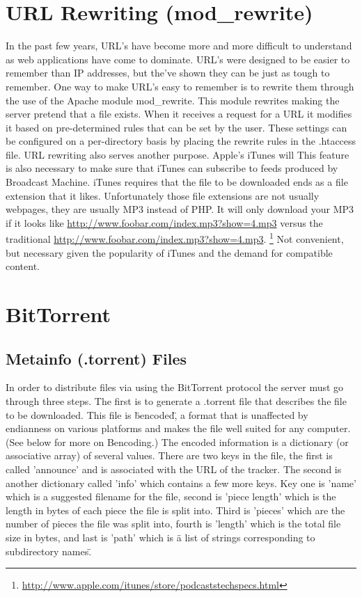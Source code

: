 \documentclass[a4paper,12pt]{report}
\begin{document}
\section{URL Rewriting (mod_rewrite)}
In the past few years, URL's have become more and more difficult to understand as web applications have come to dominate.
URL's were designed to be easier to remember than IP addresses, but the've shown they can be just as tough to remember.
One way to make URL's easy to remember is to rewrite them through the use of the Apache module mod_rewrite.
This module rewrites making the server pretend that a file exists.
When it receives a request for a URL it modifies it based on pre-determined rules that can be set by the user.
These settings can be configured on a per-directory basis by placing the rewrite rules in the .htaccess file.
URL rewriting also serves another purpose.
Apple's iTunes will 
This feature is also necessary to make sure that iTunes can subscribe to feeds produced by Broadcast Machine.
iTunes requires that the file to be downloaded ends as a file extension that it likes.
Unfortunately those file extensions are not usually webpages, they are usually MP3 instead of PHP.
It will only download your MP3 if it looks like \url{http://www.foobar.com/index.mp3?show=4.mp3} versus the traditional \url{http://www.foobar.com/index.mp3?show=4.mp3}. \footnote{\url{http://www.apple.com/itunes/store/podcaststechspecs.html}}
Not convenient, but necessary given the popularity of iTunes and the demand for compatible content.

\section{BitTorrent}
\subsection{Metainfo (.torrent) Files}
In order to distribute files via using the BitTorrent protocol the server must go through three steps.
The first is to generate a .torrent file that describes the file to be downloaded.
This file is \"bencoded\", a format that is unaffected by endianness on various platforms and makes the file well suited for any computer. (See below for more on Bencoding.)
The encoded information is a dictionary (or associative array) of several values.
There are two keys in the file, the first is called 'announce' and is associated with the URL of the tracker.
The second is another dictionary called 'info' which contains a few more keys.
Key one is 'name' which is a suggested filename for the file, second is 'piece length' which is the length in bytes of each piece the file is split into.
Third is 'pieces' which are the number of pieces the file was split into, fourth is 'length' which is the total file size in bytes, and last is 'path' which is \"a list of strings corresponding to subdirectory names\".
\end{document}
